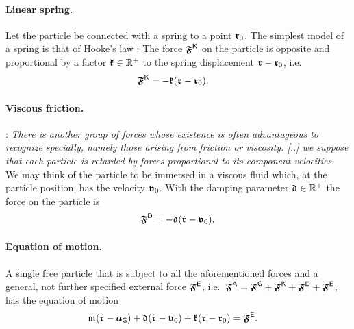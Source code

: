 \paragraph{Linear spring.}
Let the particle be connected with a spring to a point $\boldsymbol{\mathfrak{r}}_{0}$.
The simplest model of a spring is that of Hooke's law \cite{Hooke:OfSprings}: The force $\boldsymbol{\mathfrak{F}}_{}^{\mathsf{K}}$ on the particle is opposite and proportional by a factor $\mathfrak{k}_{} \in \mathbb{R}^+$ to the spring displacement $\boldsymbol{\mathfrak{r}}_{} - \boldsymbol{\mathfrak{r}}_{0}$, i.e.\
\begin{align}\label{eq:ParticleStiffness}
 \boldsymbol{\mathfrak{F}}_{}^{\mathsf{K}} &= -\mathfrak{k}_{} (\boldsymbol{\mathfrak{r}}_{} - \boldsymbol{\mathfrak{r}}_{0})
 .
\end{align}

\paragraph{Viscous friction.}
\cite[§81]{Rayleigh:TheoryOfSound}: \textit{There is another group of forces whose existence is often advantageous to recognize specially, namely those arising from friction or viscosity. [..] we suppose that each particle is retarded by forces proportional to its component velocities.}
We may think of the particle to be immersed in a viscous fluid which, at the particle position, has the velocity $\boldsymbol{\mathfrak{v}}_0$.
With the damping parameter $\mathfrak{d}_{} \in \mathbb{R}^+$ the force on the particle is
\begin{align}\label{eq:ParticleDamping}
 \boldsymbol{\mathfrak{F}}_{}^{\mathsf{D}} = -\mathfrak{d}_{} (\dot{\boldsymbol{\mathfrak{r}}}_{} - \boldsymbol{\mathfrak{v}}_0)
 .
\end{align}


\paragraph{Equation of motion.}
A single free particle that is subject to all the aforementioned forces and a general, not further specified external force $\boldsymbol{\mathfrak{F}}_{}^{\mathsf{E}}$, i.e.\ $\boldsymbol{\mathfrak{F}}_{}^{\mathsf{A}} = \boldsymbol{\mathfrak{F}}_{}^{\mathsf{G}} + \boldsymbol{\mathfrak{F}}_{}^{\mathsf{K}} + \boldsymbol{\mathfrak{F}}_{}^{\mathsf{D}} + \boldsymbol{\mathfrak{F}}_{}^{\mathsf{E}}$, has the equation of motion 
\begin{align}\label{eq:ParticleEoM}
 \mathfrak{m}_{} (\ddot{\boldsymbol{\mathfrak{r}}}_{} - \boldsymbol{a}_{\mathsf{G}}) + \mathfrak{d}_{} (\dot{\boldsymbol{\mathfrak{r}}}_{} - \boldsymbol{\mathfrak{v}}_0) + \mathfrak{k}_{} (\boldsymbol{\mathfrak{r}}_{} - \boldsymbol{\mathfrak{r}}_{0}) &= \boldsymbol{\mathfrak{F}}_{}^{\mathsf{E}}.
\end{align}

